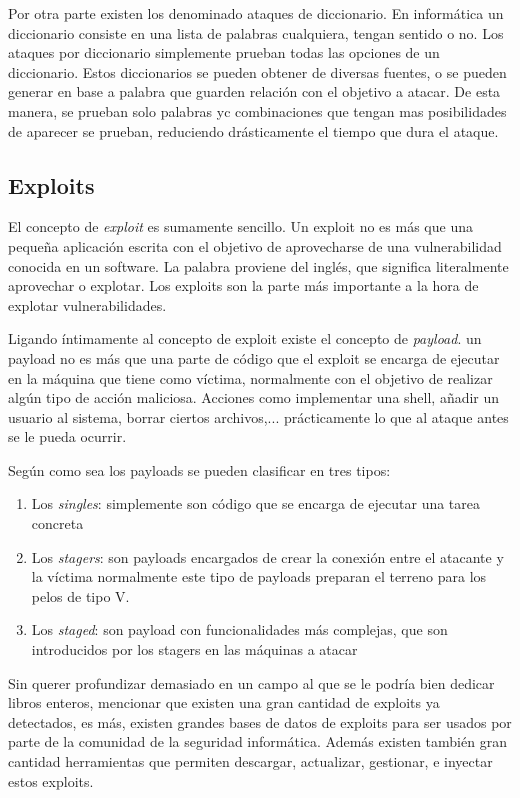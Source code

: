 Por otra parte existen los denominado ataques de diccionario. En informática un diccionario consiste en una lista de palabras cualquiera, tengan sentido o no. Los ataques por diccionario simplemente prueban todas las opciones de un diccionario. Estos diccionarios se pueden obtener de diversas fuentes, o se pueden generar en base a palabra que guarden relación con el objetivo a atacar. De esta manera, se prueban solo palabras yc combinaciones que tengan mas posibilidades de aparecer se prueban, reduciendo drásticamente el tiempo que dura el ataque.

\subsection{Exploits}

El concepto de \emph{exploit} es sumamente sencillo. Un exploit no es más que una pequeña aplicación escrita con el objetivo de aprovecharse de una vulnerabilidad conocida en un software. La palabra proviene del inglés, que significa literalmente aprovechar o explotar. Los exploits son la parte más importante a la hora de explotar vulnerabilidades.

Ligando íntimamente al concepto de exploit existe el concepto de \emph{payload}. un payload no es más que una parte de código que el exploit se encarga de ejecutar en la máquina que tiene como víctima, normalmente con el objetivo de realizar algún tipo de acción maliciosa. Acciones como implementar una shell, añadir un usuario al sistema, borrar ciertos archivos,... prácticamente lo que al ataque antes se le pueda ocurrir.

Según como sea los payloads se pueden clasificar en tres tipos:
\begin{enumerate}
	\item Los \emph{singles}: simplemente son código que se encarga de ejecutar una tarea concreta
	\item Los \emph{stagers}: son payloads encargados de crear la conexión entre el atacante y la víctima normalmente este tipo de payloads preparan el terreno para los pelos de tipo V.
	\item Los \emph{staged}: son payload con funcionalidades más complejas, que son introducidos por los stagers en las máquinas a atacar
\end{enumerate}

Sin querer profundizar demasiado en un campo al que se le podría bien dedicar libros enteros, mencionar que existen una gran cantidad de exploits ya detectados, es más, existen grandes bases de datos de exploits para ser usados por parte de la comunidad de la seguridad informática. Además existen también gran cantidad herramientas que permiten descargar, actualizar, gestionar, e inyectar estos exploits.

